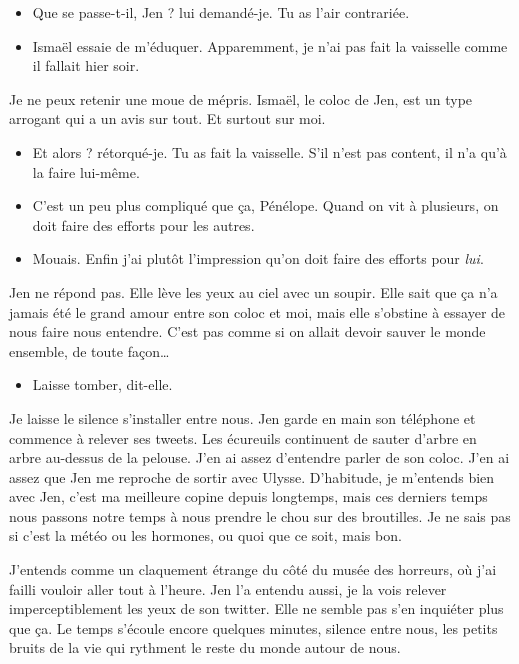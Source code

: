 \begin{itemize}
\item Que se passe-t-il, Jen ? lui demandé-je. Tu as l'air contrariée.
\item Ismaël essaie de m'éduquer. Apparemment, je n'ai pas fait la vaisselle comme il fallait hier soir.
\end{itemize}

Je ne peux retenir une moue de mépris. Ismaël, le coloc de Jen, est un type arrogant qui a un avis sur tout. Et surtout sur moi.

\begin{itemize}
\item Et alors ? rétorqué-je. Tu as fait la vaisselle. S'il n'est pas content, il n'a qu'à la faire lui-même.
\item C'est un peu plus compliqué que ça, Pénélope. Quand on vit à plusieurs, on doit faire des efforts pour les autres.
\item Mouais. Enfin j'ai plutôt l'impression qu'on doit faire des efforts pour \textit{lui}.
\end{itemize}

Jen ne répond pas. Elle lève les yeux au ciel avec un soupir. Elle sait que ça n'a jamais été le grand amour entre son coloc et moi, mais elle s'obstine à essayer de nous faire nous entendre. C'est pas comme si on allait devoir sauver le monde ensemble, de toute façon…

\begin{itemize}
\item Laisse tomber, dit-elle.
\end{itemize}

Je laisse le silence s'installer entre nous. Jen garde en main son téléphone et commence à relever ses tweets. Les écureuils continuent de sauter d'arbre en arbre au-dessus de la pelouse. J'en ai assez d'entendre parler de son coloc. J'en ai assez que Jen me reproche de sortir avec Ulysse. D'habitude, je m'entends bien avec Jen, c'est ma meilleure copine depuis longtemps, mais ces derniers temps nous passons notre temps à nous prendre le chou sur des broutilles. Je ne sais pas si c'est la météo ou les hormones, ou quoi que ce soit, mais bon.

J'entends comme un claquement étrange du côté du musée des horreurs, où j'ai failli vouloir aller tout à l'heure. Jen l'a entendu aussi, je la vois relever imperceptiblement les yeux de son twitter. Elle ne semble pas s'en inquiéter plus que ça. Le temps s'écoule encore quelques minutes, silence entre nous, les petits bruits de la vie qui rythment le reste du monde autour de nous.


